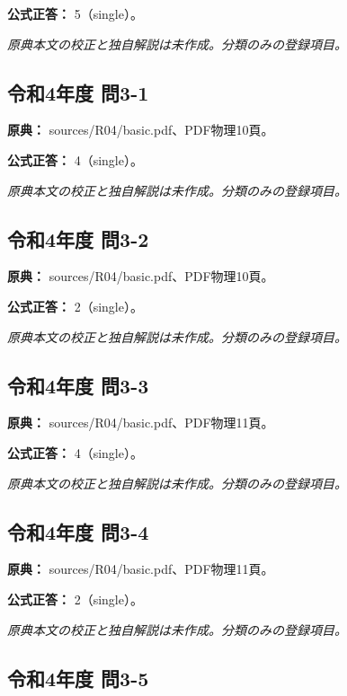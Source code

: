 \textbf{公式正答：} 5（single）。

\par\textit{原典本文の校正と独自解説は未作成。分類のみの登録項目。}

\subsection{令和4年度 問3-1}
\label{q:r04-reg-basic-3-1}

\noindent\textbf{原典：} sources/R04/basic.pdf、PDF物理10頁。

\textbf{公式正答：} 4（single）。

\par\textit{原典本文の校正と独自解説は未作成。分類のみの登録項目。}

\subsection{令和4年度 問3-2}
\label{q:r04-reg-basic-3-2}

\noindent\textbf{原典：} sources/R04/basic.pdf、PDF物理10頁。

\textbf{公式正答：} 2（single）。

\par\textit{原典本文の校正と独自解説は未作成。分類のみの登録項目。}

\subsection{令和4年度 問3-3}
\label{q:r04-reg-basic-3-3}

\noindent\textbf{原典：} sources/R04/basic.pdf、PDF物理11頁。

\textbf{公式正答：} 4（single）。

\par\textit{原典本文の校正と独自解説は未作成。分類のみの登録項目。}

\subsection{令和4年度 問3-4}
\label{q:r04-reg-basic-3-4}

\noindent\textbf{原典：} sources/R04/basic.pdf、PDF物理11頁。

\textbf{公式正答：} 2（single）。

\par\textit{原典本文の校正と独自解説は未作成。分類のみの登録項目。}

\subsection{令和4年度 問3-5}
\label{q:r04-reg-basic-3-5}

